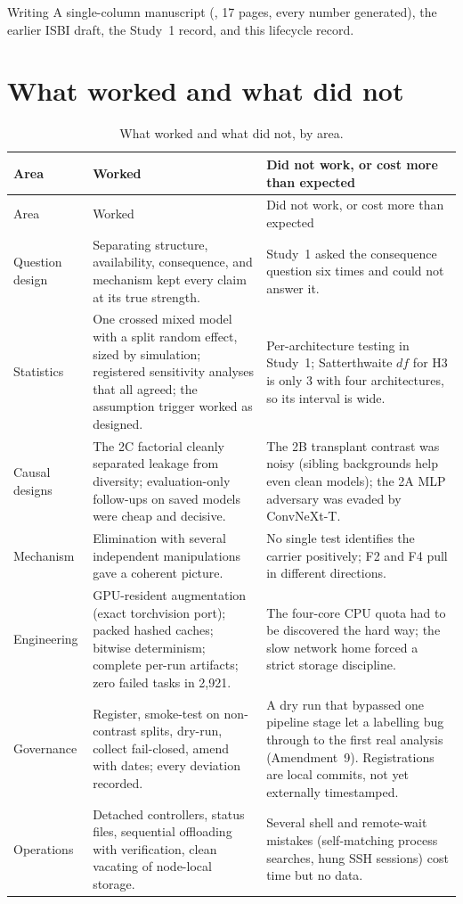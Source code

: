 \begin{workedbox}{Writing}
A single-column manuscript (, 17 pages, every number generated), the earlier ISBI draft, the Study~1
record, and this lifecycle record.
\end{workedbox}

\chapter{What worked and what did not}
\label{r:ch:worked}

{\small
\begin{longtable}{p{}p{}p{}}
\caption{What worked and what did not, by area.}\label{r:tab:worked}\\
\toprule
Area & Worked & Did not work, or cost more than expected \\
\midrule
\endfirsthead
\toprule
Area & Worked & Did not work, or cost more than expected \\
\midrule
\endhead
\bottomrule
\endfoot
Question design & Separating structure, availability, consequence, and mechanism kept every claim at its true strength. & Study~1 asked the consequence question six times and could not answer it. \\
Statistics & One crossed mixed model with a split random effect, sized by simulation; registered sensitivity analyses that all agreed; the assumption trigger worked as designed. & Per-architecture testing in Study~1; Satterthwaite $df$ for H3 is only 3 with four architectures, so its interval is wide. \\
Causal designs & The 2C factorial cleanly separated leakage from diversity; evaluation-only follow-ups on saved models were cheap and decisive. & The 2B transplant contrast was noisy (sibling backgrounds help even clean models); the 2A MLP adversary was evaded by ConvNeXt-T. \\
Mechanism & Elimination with several independent manipulations gave a coherent picture. & No single test identifies the carrier positively; F2 and F4 pull in different directions. \\
Engineering & GPU-resident augmentation (exact torchvision port); packed hashed caches; bitwise determinism; complete per-run artifacts; zero failed tasks in 2,921. & The four-core CPU quota had to be discovered the hard way; the slow network home forced a strict storage discipline. \\
Governance & Register, smoke-test on non-contrast splits, dry-run, collect fail-closed, amend with dates; every deviation recorded. & A dry run that bypassed one pipeline stage let a labelling bug through to the first real analysis (Amendment~9). Registrations are local commits, not yet externally timestamped. \\
Operations & Detached controllers, status files, sequential offloading with verification, clean vacating of node-local storage. & Several shell and remote-wait mistakes (self-matching process searches, hung SSH sessions) cost time but no data. \\
\end{longtable}
}

